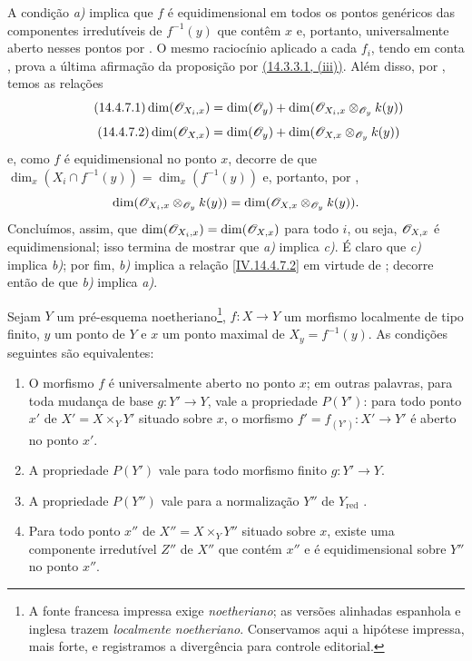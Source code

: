 A condição \emph{a)} implica que $f$ é equidimensional em todos os pontos genéricos das componentes irredutíveis de $f^{-1}(y)$ que contêm $x$  e, portanto, universalmente aberto nesses pontos por .
O mesmo raciocínio aplicado a cada $f_i$, tendo em conta , prova a última afirmação da proposição por {\hyperlink{ega4.c04.subsec.14-3-3-1}{(14.3.3.1, (iii))}}.
Além disso, por , temos as relações
\begin{equation}
\tag{14.4.7.1}
\label{IV.14.4.7.1}
  \dim(\sh{O}_{X_i,x})=\dim(\sh{O}_y)+\dim(\sh{O}_{X_i,x}\otimes_{\sh{O}_y}k(y))
\end{equation}
\begin{equation}
\tag{14.4.7.2}
\label{IV.14.4.7.2}
  \dim(\sh{O}_{X,x})=\dim(\sh{O}_y)+\dim(\sh{O}_{X,x}\otimes_{\sh{O}_y}k(y))
\end{equation}
e, como $f$ é equidimensional no ponto $x$, decorre de  que $\dim_x(X_i\cap f^{-1}(y))=\dim_x(f^{-1}(y))$ e, portanto, por ,
\[
  \dim(\mathscr{O}_{X_i,x}\otimes_{\mathscr{O}_y}k(y))=\dim(\mathscr{O}_{X,x}\otimes_{\mathscr{O}_y}k(y)).
\]
Concluímos, assim, que $\dim(\mathscr{O}_{X_i,x})=\dim(\mathscr{O}_{X,x})$ para todo $i$, ou seja, $\mathscr{O}_{X,x}$ é equidimensional; isso termina de mostrar que \emph{a)} implica \emph{c)}.
É claro que \emph{c)} implica \emph{b)}; por fim, \emph{b)} implica a relação \eqref{IV.14.4.7.2} em virtude de ; decorre então de  que \emph{b)} implica \emph{a)}.

\begin{proposition}[14.4.8]
\label{IV.14.4.8}
Sejam $Y$ um pré-esquema noetheriano\footnote{A fonte francesa impressa exige \emph{noetheriano}; as versões alinhadas espanhola e inglesa trazem \emph{localmente noetheriano}. Conservamos aqui a hipótese impressa, mais forte, e registramos a divergência para controle editorial.}, $f:X\to Y$ um morfismo localmente de tipo finito, $y$ um ponto de $Y$ e $x$ um ponto maximal de $X_y=f^{-1}(y)$.
As condições seguintes são equivalentes:
\begin{enumerate}[label=\emph{\alph*)}]
  \item O morfismo $f$ é universalmente aberto no ponto $x$; em outras palavras, para toda mudança de base $g:Y'\to Y$, vale a propriedade $P(Y')$: para todo ponto $x'$ de $X'=X\times_Y Y'$ situado sobre $x$, o morfismo $f'=f_{(Y')}:X'\to Y'$ é aberto no ponto $x'$.


  \item[\emph{a$'$)}] A propriedade $P(Y')$ vale para todo morfismo finito $g:Y'\to Y$.
  \item[\emph{a$''$)}] A propriedade $P(Y'')$ vale para a normalização $Y''$ de $Y_{\mathrm{red}}$ .
  \item Para todo ponto $x''$ de $X''=X\times_Y Y''$ situado sobre $x$, existe uma componente irredutível $Z''$ de $X''$ que contém $x''$ e é equidimensional sobre $Y''$ no ponto $x''$.
\end{enumerate}
\end{proposition}

